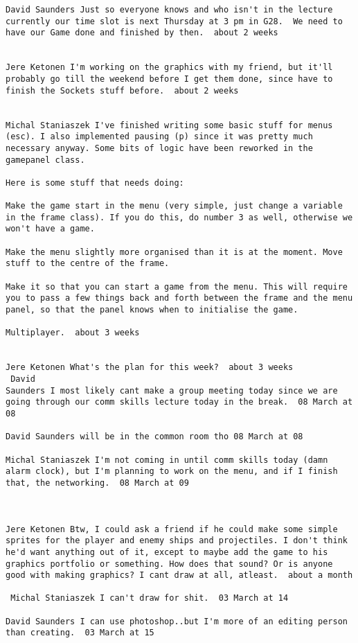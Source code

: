 \documentclass[10pt]{report}
\begin{document}
\begin{verbatim}
David Saunders Just so everyone knows and who isn't in the lecture
currently our time slot is next Thursday at 3 pm in G28.  We need to
have our Game done and finished by then.  about 2 weeks 


Jere Ketonen I'm working on the graphics with my friend, but it'll
probably go till the weekend before I get them done, since have to
finish the Sockets stuff before.  about 2 weeks 


Michal Staniaszek I've finished writing some basic stuff for menus
(esc). I also implemented pausing (p) since it was pretty much
necessary anyway. Some bits of logic have been reworked in the
gamepanel class.

Here is some stuff that needs doing:

Make the game start in the menu (very simple, just change a variable
in the frame class). If you do this, do number 3 as well, otherwise we
won't have a game.

Make the menu slightly more organised than it is at the moment. Move
stuff to the centre of the frame.

Make it so that you can start a game from the menu. This will require
you to pass a few things back and forth between the frame and the menu
panel, so that the panel knows when to initialise the game.

Multiplayer.  about 3 weeks 


Jere Ketonen What's the plan for this week?  about 3 weeks 
 David
Saunders I most likely cant make a group meeting today since we are
going through our comm skills lecture today in the break.  08 March at
08

David Saunders will be in the common room tho 08 March at 08

Michal Staniaszek I'm not coming in until comm skills today (damn
alarm clock), but I'm planning to work on the menu, and if I finish
that, the networking.  08 March at 09



Jere Ketonen Btw, I could ask a friend if he could make some simple
sprites for the player and enemy ships and projectiles. I don't think
he'd want anything out of it, except to maybe add the game to his
graphics portfolio or something. How does that sound? Or is anyone
good with making graphics? I cant draw at all, atleast.  about a month

 Michal Staniaszek I can't draw for shit.  03 March at 14

David Saunders I can use photoshop..but I'm more of an editing person
than creating.  03 March at 15


\end{verbatim}
\end{document}
